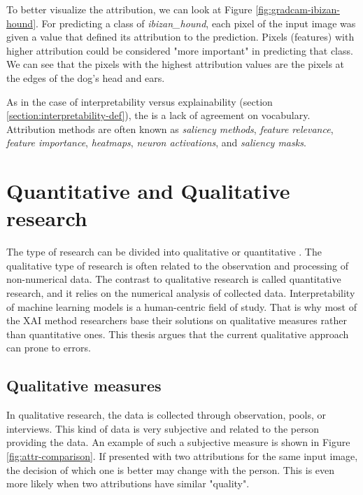 To better visualize the attribution, we can look at Figure \ref{fig:gradcam-ibizan-hound}. For predicting a class of \textit{ibizan\_hound}, each pixel of the input image was given a value that defined its attribution to the prediction. Pixels (features) with higher attribution could be considered "more important" in predicting that class. We can see that the pixels with the highest attribution values are the pixels at the edges of the dog's head and ears. 

\vspace{\baselineskip}

As in the case of interpretability versus explainability (section \ref{section:interpretability-def}), the is a lack of agreement on vocabulary. Attribution methods are often known as \textit{saliency methods}, \textit{feature relevance}, \textit{feature importance}, \textit{heatmaps}, \textit{neuron activations}, and \textit{saliency masks}.

\newpage

\section{Quantitative and Qualitative research}

The type of research can be divided into qualitative or quantitative \cite{creswell2002educational}. The qualitative type of research is often related to the observation and processing of non-numerical data. The contrast to qualitative research is called quantitative research, and  it relies on the numerical analysis of collected data. Interpretability of machine learning models is a human-centric field of study. That is why most of the XAI method researchers base their solutions on qualitative measures rather than quantitative ones. This thesis argues that the current qualitative approach can prone to errors.

\subsection{Qualitative measures}

In qualitative research, the data is collected through observation, pools, or interviews. This kind of data is very subjective and related to the person providing the data. An example of such a subjective measure is shown in Figure \ref{fig:attr-comparison}. If presented with two attributions for the same input image, the decision of which one is better may change with the person. This is even more likely when two attributions have similar "quality". 

